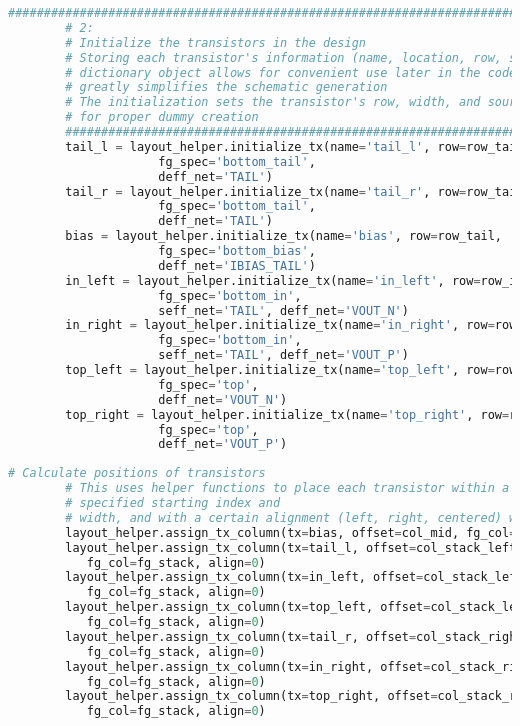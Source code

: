 \clearpage
\begin{lstlisting}[language=Python, caption=Assigning transistors to a row and initializing, label={lst:tx_init}, float]
	      ################################################################################
        # 2:
        # Initialize the transistors in the design
        # Storing each transistor's information (name, location, row, size, etc) in a 
        # dictionary object allows for convenient use later in the code, and also
        # greatly simplifies the schematic generation
        # The initialization sets the transistor's row, width, and source/drain net names
        # for proper dummy creation
        ################################################################################
        tail_l = layout_helper.initialize_tx(name='tail_l', row=row_tail,
                     fg_spec='bottom_tail',
                     deff_net='TAIL')
        tail_r = layout_helper.initialize_tx(name='tail_r', row=row_tail,
                     fg_spec='bottom_tail',
                     deff_net='TAIL')
        bias = layout_helper.initialize_tx(name='bias', row=row_tail,
                     fg_spec='bottom_bias',
                     deff_net='IBIAS_TAIL')
        in_left = layout_helper.initialize_tx(name='in_left', row=row_input,
                     fg_spec='bottom_in',
                     seff_net='TAIL', deff_net='VOUT_N')
        in_right = layout_helper.initialize_tx(name='in_right', row=row_input,
                     fg_spec='bottom_in',
                     seff_net='TAIL', deff_net='VOUT_P')
        top_left = layout_helper.initialize_tx(name='top_left', row=row_mirror,
                     fg_spec='top',
                     deff_net='VOUT_N')
        top_right = layout_helper.initialize_tx(name='top_right', row=row_mirror,
                     fg_spec='top',
                     deff_net='VOUT_P')
\end{lstlisting}
\clearpage
\begin{lstlisting}[language=Python, caption=Assigning transistors to columns, label={lst:col_assign}, float]
	      # Calculate positions of transistors
        # This uses helper functions to place each transistor within a stack/column of a
        # specified starting index and
        # width, and with a certain alignment (left, right, centered) within that column
        layout_helper.assign_tx_column(tx=bias, offset=col_mid, fg_col=fg_mid, align=0)
        layout_helper.assign_tx_column(tx=tail_l, offset=col_stack_left, 
           fg_col=fg_stack, align=0)
        layout_helper.assign_tx_column(tx=in_left, offset=col_stack_left,
           fg_col=fg_stack, align=0)
        layout_helper.assign_tx_column(tx=top_left, offset=col_stack_left, 
           fg_col=fg_stack, align=0)
        layout_helper.assign_tx_column(tx=tail_r, offset=col_stack_right, 
           fg_col=fg_stack, align=0)
        layout_helper.assign_tx_column(tx=in_right, offset=col_stack_right,
           fg_col=fg_stack, align=0)
        layout_helper.assign_tx_column(tx=top_right, offset=col_stack_right, 
           fg_col=fg_stack, align=0)
\end{lstlisting}
